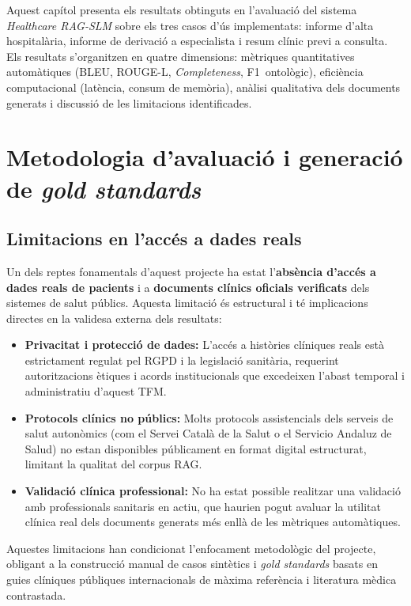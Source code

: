 \documentclass[CAT]{TFUOC}%
\begin{document}
Aquest capítol presenta els resultats obtinguts en l'avaluació del sistema \textit{Healthcare RAG-SLM} sobre els tres casos d'ús implementats: informe d'alta hospitalària, informe de derivació a especialista i resum clínic previ a consulta. Els resultats s'organitzen en quatre dimensions: mètriques quantitatives automàtiques (BLEU, ROUGE-L, \textit{Completeness}, F1~ontològic), eficiència computacional (latència, consum de memòria), anàlisi qualitativa dels documents generats i discussió de les limitacions identificades.

\section{Metodologia d'avaluació i generació de \textit{gold standards}}

\subsection{Limitacions en l'accés a dades reals}

Un dels reptes fonamentals d'aquest projecte ha estat l'\textbf{absència d'accés a dades reals de pacients} i a \textbf{documents clínics oficials verificats} dels sistemes de salut públics. Aquesta limitació és estructural i té implicacions directes en la validesa externa dels resultats:

\begin{itemize}
    \item \textbf{Privacitat i protecció de dades:} L'accés a històries clíniques reals està estrictament regulat pel RGPD i la legislació sanitària, requerint autoritzacions ètiques i acords institucionals que excedeixen l'abast temporal i administratiu d'aquest TFM.
    
    \item \textbf{Protocols clínics no públics:} Molts protocols assistencials dels serveis de salut autonòmics (com el Servei Català de la Salut o el Servicio Andaluz de Salud) no estan disponibles públicament en format digital estructurat, limitant la qualitat del corpus RAG.
    
    \item \textbf{Validació clínica professional:} No ha estat possible realitzar una validació amb professionals sanitaris en actiu, que haurien pogut avaluar la utilitat clínica real dels documents generats més enllà de les mètriques automàtiques.
\end{itemize}

Aquestes limitacions han condicionat l'enfocament metodològic del projecte, obligant a la construcció manual de casos sintètics i \textit{gold standards} basats en guies clíniques públiques internacionals de màxima referència i literatura mèdica contrastada. 
\end{document}
